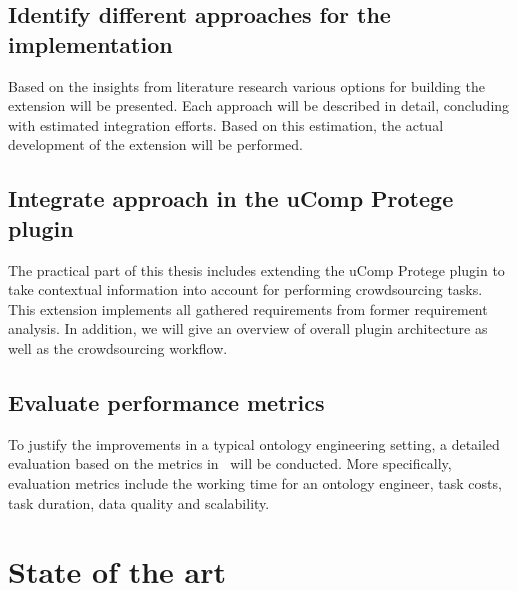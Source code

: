 \documentclass[12pt, notitlepage]{article}
\begin{document}
\subsection{Identify different approaches for the implementation}
Based on the insights from literature research various options for building the extension will be presented. Each approach will be described in detail, concluding with estimated integration efforts. Based on this estimation, the actual development of the extension will be performed. 
\subsection{Integrate approach in the uComp Protege plugin}
The practical part of this thesis includes extending the uComp Protege plugin to take contextual information into account for performing crowdsourcing tasks. This extension implements all gathered requirements from former requirement analysis. In addition, we will give an overview of overall plugin architecture as well as the crowdsourcing workflow. 
\subsection{Evaluate performance metrics}
To justify the improvements in a typical ontology engineering setting, a detailed evaluation based on the metrics in~\cite{wohlgenannt2016crowd} will be conducted. More specifically, evaluation metrics include the working time for an ontology engineer, task costs, task duration, data quality and scalability.  

\section{State of the art}
 
\end{document}
